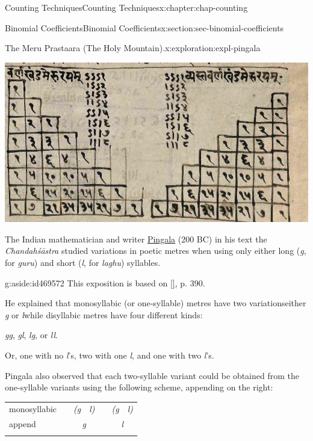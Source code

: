 \documentclass[oneside,10pt,]{book}
\newcommand{\tabularfont}{\relax}
\newcommand{\xreffont}{\relax}
\newcommand{\pubtitle}[1]{\textsl{#1}}
\numberwithin{equation}{section}
\newcommand{\hrulemedium}{\noalign{\hrule height 0.07em}}
\begin{document}
\begin{chapterptx}{Counting Techniques}{}{Counting Techniques}{}{}{x:chapter:chap-counting}
\begin{sectionptx}{Binomial Coefficients}{}{Binomial Coefficients}{}{}{x:section:sec-binomial-coefficients}
\begin{exploration}{The Meru Prastaara (The Holy Mountain).}{x:exploration:expl-pingala}
\begin{sidebyside}{1}{0.175}{0.175}{0}
\begin{sbspanel}{0.65}
\includegraphics[width=\linewidth]{figs/meru-prastaara.png}
\end{sbspanel}%
\end{sidebyside}%
\par
The Indian mathematician and writer \href{https://en.wikipedia.org/wiki/Pingala}{Pingala} (200 BC) in his text the \pubtitle{Chandahśāstra} studied variations in poetic metres when using only either long (\emph{g}, for \emph{guru}) and short (\emph{l}, for \emph{laghu}) syllables.%
\begin{aside}{}{g:aside:id469572}%
This exposition is based on \hyperlink{x:biblio:bib-kolachana-2019}{[{\xreffont 6}]}, p. 390.%
\end{aside}
He explained that monosyllabic (or one-syllable) metres have two variations\textemdash{}either \emph{g} or \emph{l}\textemdash{}while disyllabic metres have four different kinds:%
\begin{sidebyside}{1}{0.35}{0.35}{0}%
\begin{sbspanel}{0.3}%
\emph{gg}, \emph{gl}, \emph{lg}, or \emph{ll}.%
\end{sbspanel}%
\end{sidebyside}%
\par
Or, one with no \emph{l}'s, two with one \emph{l}, and one with two \emph{l}'s.%
\par
Pingala also observed that each two-syllable variant could be obtained from the one-syllable variants using the following scheme, appending on the right:%
\begin{sidebyside}{1}{0.15}{0.15}{0}%
\begin{sbspanel}{0.7}%
{\centering%
{\tabularfont%
\begin{tabular}{lllllll}
monosyllabic&&\emph{(g}&\emph{l)}&&\emph{(g}&\emph{l)}\tabularnewline[0pt]
append&&\multicolumn{2}{c}{\emph{g}}&&\multicolumn{2}{c}{\emph{l}}\tabularnewline\hrulemedium

\end{tabular}}}
\end{sbspanel}
\end{sidebyside}
\end{exploration}
\end{sectionptx}
\end{chapterptx}
\end{document}
